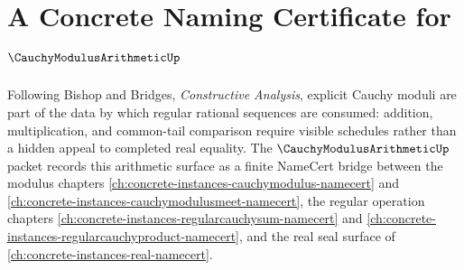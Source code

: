 \chapter{A Concrete Naming Certificate for $\CauchyModulusArithmeticUp$}
\label{ch:concrete-instances-cauchymodulusarithmetic-namecert}

Following Bishop and Bridges, \emph{Constructive Analysis}, explicit Cauchy
moduli are part of the data by which regular rational sequences are consumed:
addition, multiplication, and common-tail comparison require visible schedules
rather than a hidden appeal to completed real equality. The
$\CauchyModulusArithmeticUp$ packet records this arithmetic surface as a finite
NameCert bridge between the modulus chapters
\autoref{ch:concrete-instances-cauchymodulus-namecert} and
\autoref{ch:concrete-instances-cauchymodulusmeet-namecert}, the regular
operation chapters \autoref{ch:concrete-instances-regularcauchysum-namecert}
and \autoref{ch:concrete-instances-regularcauchyproduct-namecert}, and the
real seal surface of \autoref{ch:concrete-instances-real-namecert}.

